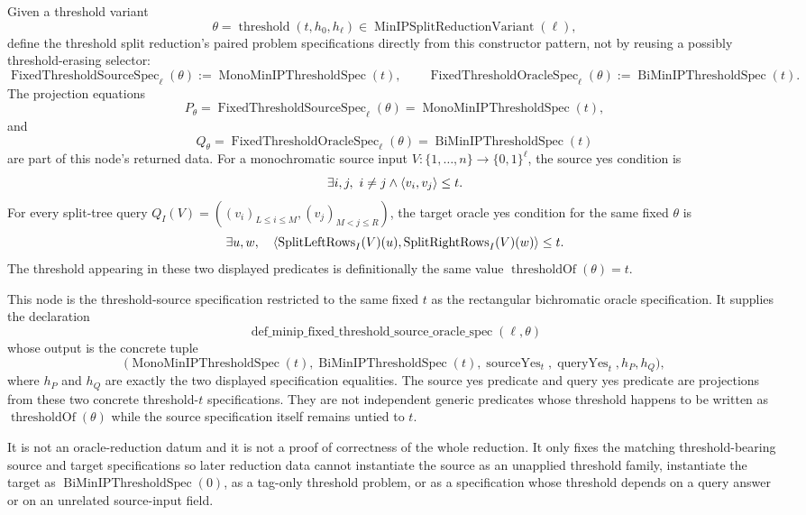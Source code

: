 \begin{definition}
  \label{def:minip-fixed-threshold-source-oracle-spec}
  Given a threshold variant
  \[
    \theta=\operatorname{threshold}(t,h_0,h_\ell)
    \in\operatorname{MinIPSplitReductionVariant}(\ell),
  \]
  define the threshold split reduction's paired problem specifications
  directly from this constructor pattern, not by reusing a possibly
  threshold-erasing selector:
  \[
    \operatorname{FixedThresholdSourceSpec}_{\ell}(\theta)
      :=\operatorname{MonoMinIPThresholdSpec}(t),
    \qquad
    \operatorname{FixedThresholdOracleSpec}_{\ell}(\theta)
      :=\operatorname{BiMinIPThresholdSpec}(t).
  \]
  The projection equations
  \[
    P_\theta
      =
    \operatorname{FixedThresholdSourceSpec}_{\ell}(\theta)
      =
    \operatorname{MonoMinIPThresholdSpec}(t),
  \]
  and
  \[
    Q_\theta
      =
    \operatorname{FixedThresholdOracleSpec}_{\ell}(\theta)
      =
    \operatorname{BiMinIPThresholdSpec}(t)
  \]
  are part of this node's returned data.
  For a monochromatic source input
  $V:\{1,\ldots,n\}\to\{0,1\}^{\ell}$, the source yes condition is
  \[
    \exists i,j,\ i\neq j\wedge \ip{v_i}{v_j}\leq t.
  \]
  For every split-tree query
  $Q_I(V)=((v_i)_{L\leq i\leq M},(v_j)_{M<j\leq R})$, the target oracle yes
  condition for the same fixed $\theta$ is
  \[
    \exists u,w,\quad
      \left\langle \operatorname{SplitLeftRows}_I(V)(u),\operatorname{SplitRightRows}_I(V)(w)\right\rangle
      \leq t.
  \]
  The threshold appearing in these two displayed predicates is definitionally
  the same value $\operatorname{thresholdOf}(\theta)=t$.

  This node is the threshold-source specification restricted to the same fixed
  $t$ as the rectangular bichromatic oracle specification.  It supplies the
  declaration
  \[
    \operatorname{def\_minip\_fixed\_threshold\_source\_oracle\_spec}
      (\ell,\theta)
  \]
  whose output is the concrete tuple
  \[
    \bigl(
      \operatorname{MonoMinIPThresholdSpec}(t),
      \operatorname{BiMinIPThresholdSpec}(t),
      \operatorname{sourceYes}_t,
      \operatorname{queryYes}_t,
      h_P,h_Q
    \bigr),
  \]
  where $h_P$ and $h_Q$ are exactly the two displayed specification equalities.
  The source yes predicate and query yes predicate are projections from these
  two concrete threshold-$t$ specifications.  They are not independent generic
  predicates whose threshold happens to be written as
  $\operatorname{thresholdOf}(\theta)$ while the source specification itself
  remains untied to $t$.

  It is not an oracle-reduction datum and it is not a proof of correctness of
  the whole reduction.  It only fixes the matching threshold-bearing source
  and target specifications so later reduction data cannot instantiate the
  source as an unapplied threshold family, instantiate the target as
  $\operatorname{BiMinIPThresholdSpec}(0)$, as a tag-only threshold problem, or
  as a specification whose threshold depends on a query answer or on an
  unrelated source-input field.
\end{definition}


